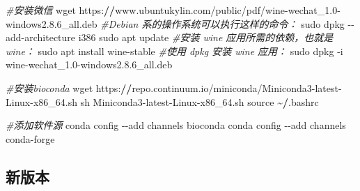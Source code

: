 \documentclass[
  10pt,
]{book}
\newenvironment{Shaded}{\begin{snugshade}}{\end{snugshade}}
\newcommand{\CommentTok}[1]{\textcolor[rgb]{0.56,0.35,0.01}{\textit{#1}}}
\newcommand{\ErrorTok}[1]{\textcolor[rgb]{0.64,0.00,0.00}{\textbf{#1}}}
\newcommand{\FloatTok}[1]{\textcolor[rgb]{0.00,0.00,0.81}{#1}}
\newcommand{\NormalTok}[1]{#1}
\newcommand{\SpecialCharTok}[1]{\textcolor[rgb]{0.00,0.00,0.00}{#1}}
\begin{document}
\begin{Shaded}
\begin{Highlighting}[]
\CommentTok{\#安装微信}
\NormalTok{wget https}\SpecialCharTok{:}\ErrorTok{//}\NormalTok{www.ubuntukylin.com}\SpecialCharTok{/}\NormalTok{public}\SpecialCharTok{/}\NormalTok{pdf}\SpecialCharTok{/}\NormalTok{wine}\SpecialCharTok{{-}}\NormalTok{wechat\_1}\FloatTok{.0}\SpecialCharTok{{-}}\NormalTok{windows2.}\FloatTok{8.6}\NormalTok{\_all.deb}
\CommentTok{\#Debian 系的操作系统可以执行这样的命令：}
\NormalTok{sudo dpkg }\SpecialCharTok{{-}{-}}\NormalTok{add}\SpecialCharTok{{-}}\NormalTok{architecture i386}
\NormalTok{sudo apt update}
\CommentTok{\#安装 wine 应用所需的依赖，也就是 wine：}
\NormalTok{sudo apt install wine}\SpecialCharTok{{-}}\NormalTok{stable}
\CommentTok{\#使用 dpkg 安装 wine 应用：}
\NormalTok{sudo dpkg }\SpecialCharTok{{-}}\NormalTok{i wine}\SpecialCharTok{{-}}\NormalTok{wechat\_1}\FloatTok{.0}\SpecialCharTok{{-}}\NormalTok{windows2.}\FloatTok{8.6}\NormalTok{\_all.deb}

\CommentTok{\#安装bioconda}
\NormalTok{wget https}\SpecialCharTok{:}\ErrorTok{//}\NormalTok{repo.continuum.io}\SpecialCharTok{/}\NormalTok{miniconda}\SpecialCharTok{/}\NormalTok{Miniconda3}\SpecialCharTok{{-}}\NormalTok{latest}\SpecialCharTok{{-}}\NormalTok{Linux}\SpecialCharTok{{-}}\NormalTok{x86\_64.sh  }
\NormalTok{sh Miniconda3}\SpecialCharTok{{-}}\NormalTok{latest}\SpecialCharTok{{-}}\NormalTok{Linux}\SpecialCharTok{{-}}\NormalTok{x86\_64.sh  }
\NormalTok{source }\SpecialCharTok{\textasciitilde{}}\ErrorTok{/}\NormalTok{.bashrc}

\CommentTok{\#添加软件源}
\NormalTok{conda config }\SpecialCharTok{{-}{-}}\NormalTok{add channels bioconda }
\NormalTok{conda config }\SpecialCharTok{{-}{-}}\NormalTok{add channels conda}\SpecialCharTok{{-}}\NormalTok{forge}
\end{Highlighting}
\end{Shaded}

\hypertarget{ux65b0ux7248ux672c}{%
\subsection{新版本}\label{ux65b0ux7248ux672c}}
\end{document}
